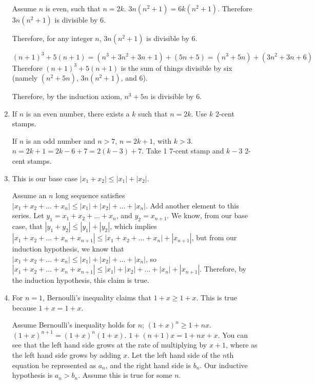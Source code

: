 \documentclass[12pt,letterpaper]{article}
\begin{document}
\begin{enumerate}
{Assume $n$ is even, such that $n = 2k$. $3n(n^2 + 1) = 6k(n^2 + 1)$. Therefore $3n(n^2 + 1)$ is divisible by $6$.

Therefore, for any integer $n$, $3n(n^2 + 1)$ is divisible by $6$.

$(n+1)^3 + 5(n+1) = (n^3 + 3n^2 + 3n + 1) + (5n + 5) = (n^3 + 5n) + (3n^2 + 3n + 6)$ Therefore $(n+1)^3 + 5(n+1)$ is the sum of things divisible by six (namely $(n^2 + 5n)$, $3n(n^2 + 1)$, and $6$).

Therefore, by the induction axiom, $n^3 + 5n$ is divisible by $6$.
}

\item {If $n$ is an even number, there exists a $k$ such that $n = 2k$. Use $k$ 2-cent stamps.

If $n$ is an odd number and $n>7$, $n = 2k+1$, with $k>3$. $n = 2k+1 = 2k - 6 + 7 = 2(k - 3) + 7$. Take 1 7-cent stamp and $k - 3$ 2-cent stamps.}

\item {
This is our base case $|x_1 + x_2| \leq |x_1| + |x_2|$.

Assume an $n$ long sequence satisfies $|x_1 + x_2 + \ldots + x_n| \leq |x_1| + |x_2| + \ldots + |x_n|$. Add another element to this series. Let $y_1 = x_1 + x_2 + \ldots + x_n$, and $y_2 = x_{n+1}$. We know, from our base case, that $|y_1 + y_2| \leq |y_1| + |y_2|$, which implies $|x_1 + x_2 + \ldots + x_n + x_{n+1}| \leq |x_1 + x_2 + \ldots + x_n| + |x_{n+1}|$, but from our induction hypothesis, we know that $|x_1 + x_2 + \ldots + x_n| \leq |x_1| + |x_2| + \ldots + |x_n|$, so $|x_1 + x_2 + \ldots + x_n + x_{n+1}| \leq |x_1| + |x_2| + \ldots + |x_n| + |x_{n+1}|$. Therefore, by the induction hypothesis, this claim is true.
}

\item {For $n = 1$, Bernoulli's inequality claims that $1 + x \geq 1 + x$. This     is true because $1 + x = 1 + x$.

Assume Bernoulli's inequality holds for $n$; $(1+x)^n \geq 1 + nx$. $(1 + x)^{n + 1} = (1 + x)^n (1 + x)$. $1 + (n + 1)x = 1 + nx + x$. You can see that the left hand side grows at the rate of multiplying by $x + 1$, where as the left hand side grows by adding $x$. Let the left hand side of the $n$th equation be represented as $a_n$, and the right hand side is $b_n$. Our inductive hypothesis is $ a_n > b_n$. Assume this is true for some $n$.

}
\end{enumerate}
\end{document}
